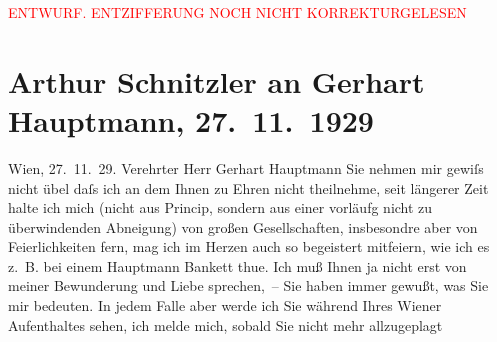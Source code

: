 
\begin{center}
            \textcolor{red}{ENTWURF. ENTZIFFERUNG NOCH NICHT KORREKTURGELESEN}
                      \end{center}
            
               \section[Arthur Schnitzler an Gerhart Hauptmann, 27. 11. 1929]{ Arthur Schnitzler an Gerhart Hauptmann, 27. 11. 1929}\nopagebreak{}\rehead{ }\begin{ledgroupsized}[t]{13cm}\normalsize\beginnumbering{} \toendnotes[C]{\smallbreak\pagebreak[2]} 
\toendnotes[C]{\smallbreak}\pstart
           \raggedleft{}{\pb}Wien, 27. 11. 29.\pend
           \pstart{}Verehrter Herr Gerhart Hauptmann\pend\pstart
           Sie nehmen mir gewiſs nicht übel daſs ich an dem \label{K_L02526_1v}\label{K_L02526_1h} Ihnen zu Ehren nicht theilnehme, seit
               längerer Zeit halte ich mich (nicht aus Princip, sondern aus einer vorläufg nicht zu
               überwindenden Abneigung) von großen Gesellschaften, insbesondre aber von
               Feierlichkeiten fern, mag ich im Herzen auch so begeistert mitfeiern, wie ich es
               z. B. bei einem Hauptmann Bankett thue. Ich muß Ihnen ja nicht erst von meiner
               Bewunderung und Liebe sprechen, – Sie haben immer gewußt, was Sie {\pb}mir bedeuten. \pend
           \pstart
           In jedem Falle aber werde ich Sie während Ihres Wiener Aufenthaltes sehen, ich melde mich, sobald Sie nicht mehr allzugeplagt

\end{ledgroupsized}

